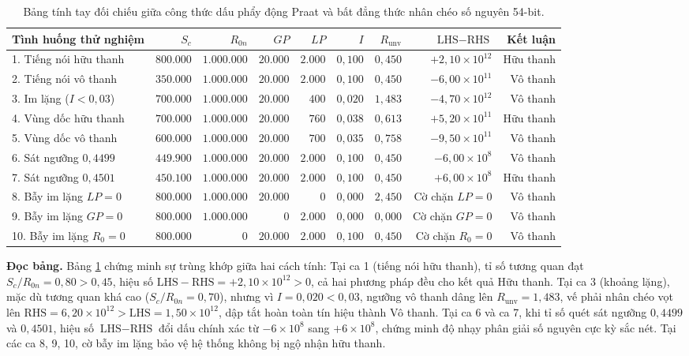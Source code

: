 \begin{table}[htbp]
\centering
\small
\setlength{\tabcolsep}{3.5pt}
\caption{Bảng tính tay đối chiếu giữa công thức dấu phẩy động Praat và bất đẳng thức nhân chéo số nguyên 54-bit.}
\label{tab:ch10_hand_calc}
\begin{tabular}{lrrrrrrrr}
\toprule
\textbf{Tình huống thử nghiệm} & $S_c$ & $R_{0n}$ & $GP$ & $LP$ & $I$ & $R_{\text{unv}}$ & $\text{LHS} - \text{RHS}$ & \textbf{Kết luận} \\
\midrule
1. Tiếng nói hữu thanh & $800.000$ & $1.000.000$ & $20.000$ & $2.000$ & $0{,}100$ & $0{,}450$ & $+2{,}10 \times 10^{12}$ & Hữu thanh \\
2. Tiếng nói vô thanh & $350.000$ & $1.000.000$ & $20.000$ & $2.000$ & $0{,}100$ & $0{,}450$ & $-6{,}00 \times 10^{11}$ & Vô thanh \\
3. Im lặng ($I < 0{,}03$) & $700.000$ & $1.000.000$ & $20.000$ & $400$ & $0{,}020$ & $1{,}483$ & $-4{,}70 \times 10^{12}$ & Vô thanh \\
4. Vùng dốc hữu thanh & $700.000$ & $1.000.000$ & $20.000$ & $760$ & $0{,}038$ & $0{,}613$ & $+5{,}20 \times 10^{11}$ & Hữu thanh \\
5. Vùng dốc vô thanh & $600.000$ & $1.000.000$ & $20.000$ & $700$ & $0{,}035$ & $0{,}758$ & $-9{,}50 \times 10^{11}$ & Vô thanh \\
6. Sát ngưỡng $0{,}4499$ & $449.900$ & $1.000.000$ & $20.000$ & $2.000$ & $0{,}100$ & $0{,}450$ & $-6{,}00 \times 10^{8}$ & Vô thanh \\
7. Sát ngưỡng $0{,}4501$ & $450.100$ & $1.000.000$ & $20.000$ & $2.000$ & $0{,}100$ & $0{,}450$ & $+6{,}00 \times 10^{8}$ & Hữu thanh \\
8. Bẫy im lặng $LP = 0$ & $800.000$ & $1.000.000$ & $20.000$ & $0$ & $0{,}000$ & $2{,}450$ & Cờ chặn $LP=0$ & Vô thanh \\
9. Bẫy im lặng $GP = 0$ & $800.000$ & $1.000.000$ & $0$ & $2.000$ & $0{,}000$ & $0{,}000$ & Cờ chặn $GP=0$ & Vô thanh \\
10. Bẫy im lặng $R_0 = 0$ & $800.000$ & $0$ & $20.000$ & $2.000$ & $0{,}100$ & $0{,}450$ & Cờ chặn $R_0=0$ & Vô thanh \\
\bottomrule
\end{tabular}
\end{table}

\textbf{Đọc bảng.} Bảng \ref{tab:ch10_hand_calc} chứng minh sự trùng khớp giữa hai cách tính:
Tại ca 1 (tiếng nói hữu thanh), tỉ số tương quan đạt $S_c / R_{0n} = 0{,}80 > 0{,}45$, hiệu số $\text{LHS} - \text{RHS} = +2{,}10 \times 10^{12} > 0$, cả hai phương pháp đều cho kết quả Hữu thanh.
Tại ca 3 (khoảng lặng), mặc dù tương quan khá cao ($S_c / R_{0n} = 0{,}70$), nhưng vì $I = 0{,}020 < 0{,}03$, ngưỡng vô thanh dâng lên $R_{\text{unv}} = 1{,}483$, vế phải nhân chéo vọt lên $\text{RHS} = 6{,}20 \times 10^{12} > \text{LHS} = 1{,}50 \times 10^{12}$, dập tắt hoàn toàn tín hiệu thành Vô thanh.
Tại ca 6 và ca 7, khi tỉ số quét sát ngưỡng $0{,}4499$ và $0{,}4501$, hiệu số $\text{LHS} - \text{RHS}$ đổi dấu chính xác từ $-6 \times 10^8$ sang $+6 \times 10^8$, chứng minh độ nhạy phân giải số nguyên cực kỳ sắc nét.
Tại các ca 8, 9, 10, cờ bẫy im lặng bảo vệ hệ thống không bị ngộ nhận hữu thanh.

